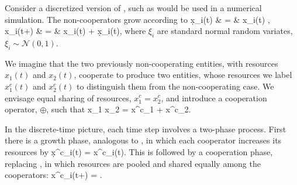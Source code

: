  Consider a discretized version of , such as would be used in a numerical simulation. The non-cooperators grow according to
 \bea
 \d x_i(t) & = & x_i(t) ,  \\
 x_i(t+\dt) & = & x_i(t) + \d x_i(t), 
 \eea
 where $\xi_i$ are standard normal random variates, $\xi_i\sim \mathcal{N}(0,1)$.

We imagine that the two previously non-cooperating entities, with resources $x_1(t)$ and $x_2(t)$, cooperate to produce two entities, whose resources we label $x^c_1(t)$ and $x^c_2(t)$ to distinguish them from the non-cooperating case. We envisage equal sharing of resources, $x^c_1=x^c_2$, and introduce a cooperation operator, $\oplus$, such that
 \be
 x_1 \oplus x_2 = x^c_1 + x^c_2.
 \ee
 
 In the discrete-time picture, each time step involves a two-phase process. First there is a growth phase, analogous to , in which each cooperator increases its resources by
 \be
 \d x^c_i(t) = x^c_i(t).
 \ee
 This is followed by a cooperation phase, replacing , in which resources are pooled and shared equally among the cooperators:
 \be
 x^c_i(t+\dt) = .
 \ee
 
